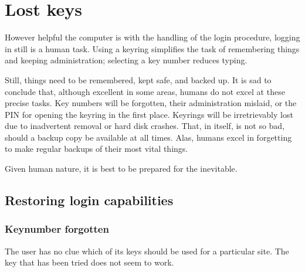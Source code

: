\section{Lost keys}
However helpful the computer is with the handling of the login procedure, logging in still is a human task.
Using a keyring simplifies the task of remembering things and keeping administration; selecting a key number reduces typing.
\par
Still, things need to be remembered, kept safe, and backed up.
It is sad to conclude that,
although excellent in some areas,
humans do not excel at these precise tasks.
Key numbers will be forgotten,
their administration mislaid,
or the PIN for opening the keyring in the first place.
Keyrings will be irretrievably lost due to inadvertent removal or hard disk crashes.
That, in itself, is not so bad,
should a backup copy be available at all times.
Alas, humans excel in forgetting to make regular backups of their most vital things.
\par
Given human nature, it is best to be prepared for the inevitable.

\subsection{Restoring login capabilities}
\subsubsection{Keynumber forgotten}
The user has no clue which of its keys should be used for a particular site.
The key that has been tried does not seem to work.
